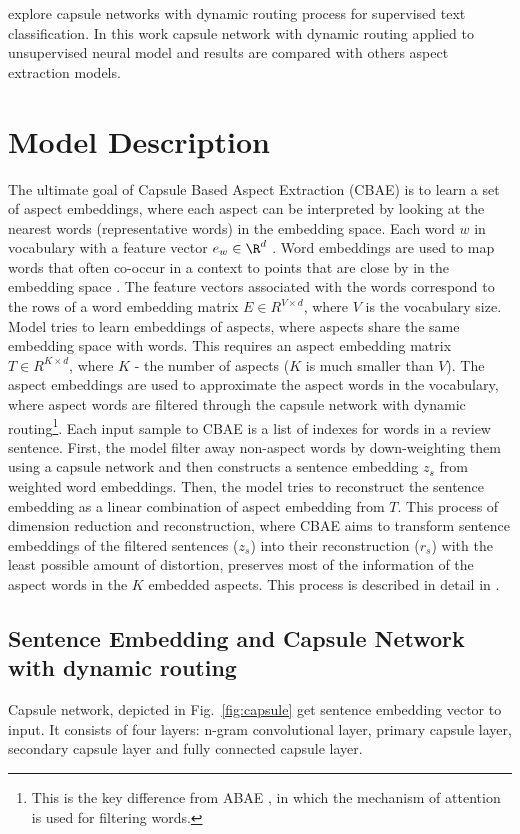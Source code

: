 \documentclass{article}
\begin{document}
\cite{Zhao2018} explore capsule networks with dynamic routing process \cite{Hinton2017DRBC} for supervised text classification. In this work capsule network with dynamic routing applied to unsupervised neural model and results are compared with others aspect extraction models.

\section{Model Description}
The ultimate goal of Capsule Based Aspect Extraction (CBAE) is to learn a set of aspect embeddings, where each aspect can be interpreted by looking at the nearest words (representative words) in the embedding space. Each word $w$ in vocabulary with a feature vector $e_w \in \R^d$ \cite{He2018ABAE}. Word embeddings are used to map words that often co-occur in a context to points that are close by in the embedding space \cite{Mikolov2013W2V}. The feature vectors associated with the words correspond to the rows of a word embedding matrix $E \in R^{V \times d}$, where $V$ is the vocabulary size. Model tries to learn embeddings of aspects, where aspects share the same embedding space with words. This requires an aspect embedding matrix $T \in R^{K \times d}$, where $K$ - the number of aspects ($K$ is much smaller than $V$). The aspect embeddings are used to approximate the aspect words in the vocabulary, where aspect words are filtered through the capsule network with dynamic routing\footnote{This is the key difference from ABAE \cite{He2018ABAE} , in which the mechanism of attention is used for filtering words.}.
Each input sample to CBAE is a list of indexes for words in a review sentence. First, the model filter away non-aspect words by down-weighting them using a capsule network and then constructs a sentence embedding $z_s$ from weighted word embeddings. Then, the model tries to reconstruct the sentence embedding as a linear combination of aspect embedding from $T$. This process of dimension reduction and reconstruction, where CBAE aims to transform sentence embeddings of the filtered sentences ($z_s$) into their reconstruction ($r_s$) with the least possible amount of distortion, preserves most of the information of the aspect words in the $K$ embedded aspects. This process is described in detail in \cite{He2018ABAE}.

\subsection{Sentence Embedding and Capsule Network with dynamic routing}
Capsule network, depicted in Fig.~\ref{fig:capsule} get sentence embedding vector to input. It consists of four layers: n-gram convolutional layer, primary capsule layer, secondary capsule layer and fully connected capsule layer.
\end{document}
